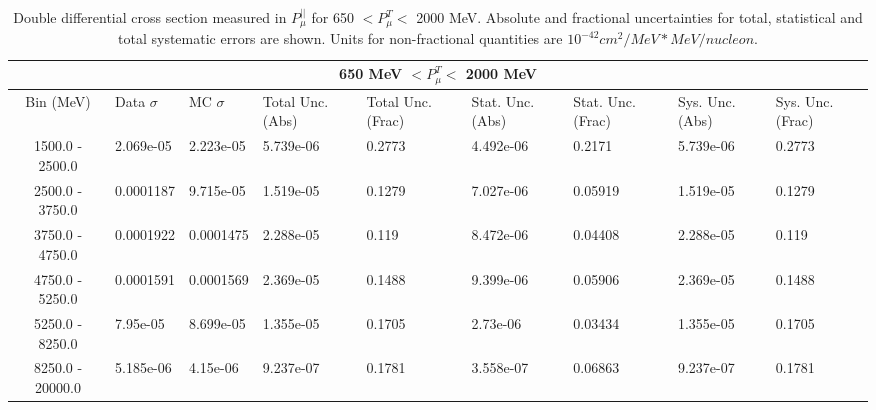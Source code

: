 \begin{table}[!htb]
    \centering
    \tiny
    \begin{tabular}{|c|p{0.5in}|p{0.5in}|p{0.5in}|p{0.5in}|p{0.5in}|p{0.5in}|p{0.5in}|p{0.5in}|}

        \hline
        \multicolumn{9}{c}{650 MeV $ < P^T_\mu < $ 2000 MeV}\\
        \hline
        Bin (MeV)& Data $\sigma$ & MC $\sigma$ & Total Unc. (Abs) & Total Unc. (Frac)  & Stat. Unc. (Abs) & Stat. Unc. (Frac) & Sys. Unc. (Abs) & Sys. Unc. (Frac)\\ \hline
1500.0 - 2500.0 & 2.069e-05 & 2.223e-05 & 5.739e-06 & 0.2773 & 4.492e-06 & 0.2171 & 5.739e-06 & 0.2773\\ \hline
2500.0 - 3750.0 & 0.0001187 & 9.715e-05 & 1.519e-05 & 0.1279 & 7.027e-06 & 0.05919 & 1.519e-05 & 0.1279\\ \hline
3750.0 - 4750.0 & 0.0001922 & 0.0001475 & 2.288e-05 & 0.119 & 8.472e-06 & 0.04408 & 2.288e-05 & 0.119\\ \hline
4750.0 - 5250.0 & 0.0001591 & 0.0001569 & 2.369e-05 & 0.1488 & 9.399e-06 & 0.05906 & 2.369e-05 & 0.1488\\ \hline
5250.0 - 8250.0 & 7.95e-05 & 8.699e-05 & 1.355e-05 & 0.1705 & 2.73e-06 & 0.03434 & 1.355e-05 & 0.1705\\ \hline
8250.0 - 20000.0 & 5.185e-06 & 4.15e-06 & 9.237e-07 & 0.1781 & 3.558e-07 & 0.06863 & 9.237e-07 & 0.1781\\ \hline

    \end{tabular}
    \caption{Double differential cross section measured in $P^{||}_\mu$ for 650 $ < P^T_\mu < $ 2000 MeV. Absolute and fractional uncertainties for total, statistical and total systematic errors are shown. Units for non-fractional quantities are $10^{-42}cm^2/MeV*MeV/nucleon$.}
    \label{tab:ApdxA:XSecTable2Dpzmupimu6}
\end{table}







